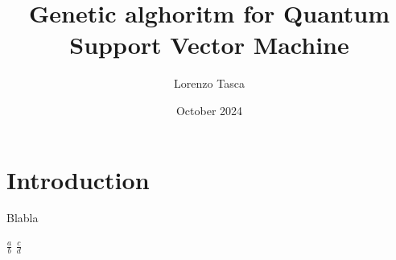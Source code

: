 \documentclass[a4paper]{article}
\title{Genetic alghoritm for Quantum Support Vector Machine}
\author{Lorenzo Tasca}
\date{October 2024}
\begin{document}
\maketitle
\tableofcontents

\newpage


\section{Introduction}


Blabla

$\frac{a}{b}$
$\frac{c}{d}$
\end{document}
